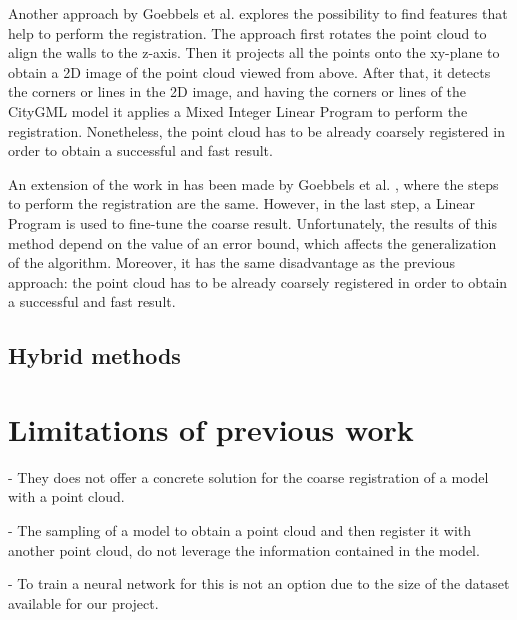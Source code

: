         Another approach by Goebbels et al. \cite{Goebbels_2018_linebased} explores the possibility to find features that help to perform the registration.
        The approach first rotates the point cloud to align the walls to the z-axis. Then it projects all the points onto the 
        xy-plane to obtain a 2D image of the point cloud viewed from above. After that, it detects the corners or lines in the 2D image,
        and having the corners or lines of the CityGML model it applies a Mixed Integer Linear Program to perform the registration.
        Nonetheless, the point cloud has to be already coarsely registered in order to obtain a successful and fast result.

        An extension of the work in \cite{Goebbels_2018_linebased} has been made by Goebbels et al. \cite{Goebbels_2018_alinear}, 
        where the steps to perform the registration are the same.
        However, in the last step, a Linear Program is used to fine-tune the coarse result. 
        Unfortunately, the results of this method depend on the value of an error bound, which affects the generalization of the algorithm.
        Moreover, it has the same disadvantage as the previous approach: 
        the point cloud has to be already coarsely registered in order to obtain a successful and fast result.
    
        \subsection{Hybrid methods}

        
        

    \section{Limitations of previous work}
        - They does not offer a concrete solution for the coarse registration of a model with a point cloud. \par
        - The sampling of a model to obtain a point cloud and then register it with another point cloud, do not leverage the information contained in the model. \par
        - To train a neural network for this is not an option due to the size of the dataset available for our project.


